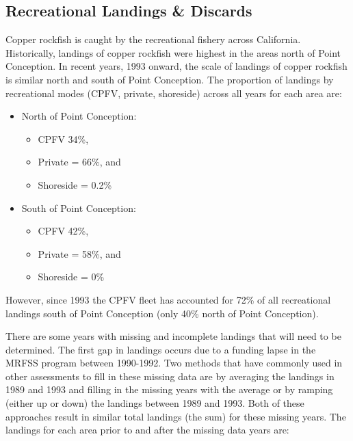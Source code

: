 \documentclass[
]{article}
\providecommand{\tightlist}{%
  \setlength{\itemsep}{0pt}\setlength{\parskip}{0pt}}
\begin{document}
\hypertarget{recreational-landings-discards}{%
\subsection{Recreational Landings \&
Discards}\label{recreational-landings-discards}}

Copper rockfish is caught by the recreational fishery across California.
Historically, landings of copper rockfish were highest in the areas
north of Point Conception. In recent years, 1993 onward, the scale of
landings of copper rockfish is similar north and south of Point
Conception. The proportion of landings by recreational modes (CPFV,
private, shoreside) across all years for each area are:

\begin{itemize}
\tightlist
\item
  North of Point Conception:

  \begin{itemize}
  \tightlist
  \item
    CPFV 34\%,
  \item
    Private = 66\%, and
  \item
    Shoreside = 0.2\%
  \end{itemize}
\item
  South of Point Conception:

  \begin{itemize}
  \tightlist
  \item
    CPFV 42\%,
  \item
    Private = 58\%, and
  \item
    Shoreside = 0\%
  \end{itemize}
\end{itemize}

However, since 1993 the CPFV fleet has accounted for 72\% of all
recreational landings south of Point Conception (only 40\% north of
Point Conception).

There are some years with missing and incomplete landings that will need
to be determined. The first gap in landings occurs due to a funding
lapse in the MRFSS program between 1990-1992. Two methods that have
commonly used in other assessments to fill in these missing data are by
averaging the landings in 1989 and 1993 and filling in the missing years
with the average or by ramping (either up or down) the landings between
1989 and 1993. Both of these approaches result in similar total landings
(the sum) for these missing years. The landings for each area prior to
and after the missing data years are:
\end{document}
